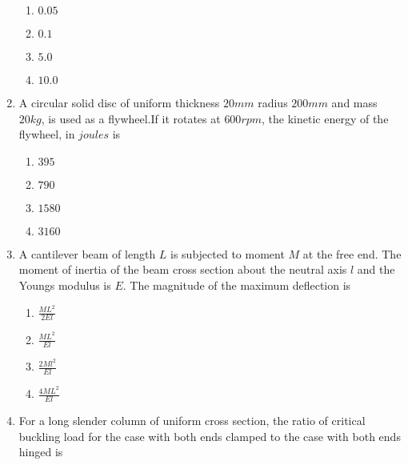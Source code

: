 \documentclass[journal]{IEEEtran}
\begin{document}
\begin{enumerate}
    \begin{enumerate}
        \item $0.05$
        \item $0.1$
        \item $5.0$
        \item $10.0$
    \end{enumerate}
    \item A circular solid disc of uniform thickness $20 mm$ radius $200mm$ and mass $20kg$, is used as a flywheel.If it rotates at $600 rpm$, the kinetic energy of the flywheel, in $joules$ is
    \begin{enumerate}
        \item $395$
        \item $790$
        \item $1580$
        \item $3160$
    \end{enumerate}
    \item A cantilever beam of length $L$ is subjected to moment $M$ at the free end. The moment of inertia of the beam cross section about the neutral axis $l$ and the Youngs modulus is $E$. The magnitude of the maximum deflection is
    \begin{enumerate}
        \item $\frac{ML^2}{2El}$
        \item $\frac{ML^2}{El}$
        \item $\frac{2Ml^2}{El}$
        \item $\frac{4ML^2}{El}$
    \end{enumerate}
    \item For a long slender column of uniform cross section, the ratio of critical buckling load for the case with both ends clamped to the case with both ends hinged is

\end{enumerate}
\end{document}
